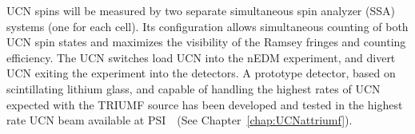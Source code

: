 UCN spins will be measured by two separate simultaneous spin analyzer
(SSA) systems (one for each cell). Its configuration allows
simultaneous counting of both UCN spin states and maximizes the
visibility of the Ramsey fringes and counting efficiency.  The UCN
switches load UCN into the nEDM experiment, and divert UCN exiting the
experiment into the detectors.  A prototype detector, based on
scintillating lithium glass, and capable of handling the highest rates
of UCN expected with the TRIUMF source has been developed and tested
in the highest rate UCN beam available at
PSI~\cite{jamieson2017characterization}~(See
Chapter~\ref{chap:UCNattriumf}).










